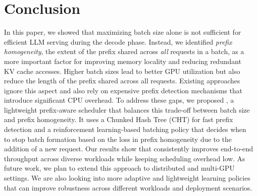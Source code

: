\vspace{-7pt}

\section{Conclusion}
\label{sec:conclusion}
In this paper, we showed that maximizing batch size alone is not sufficient for efficient LLM serving during the decode phase. Instead, we identified \textit{prefix homogeneity}, the extent of the prefix shared across \textit{all} requests in a batch, as a more important factor for improving memory locality and reducing redundant KV cache accesses. Higher batch sizes lead to better GPU utilization but also reduce the length of the prefix shared across all requests. Existing approaches ignore this aspect and also rely on expensive prefix detection mechanisms that introduce significant CPU overhead. To address these gaps, we proposed \Feather, a lightweight prefix-aware scheduler that balances this trade-off between batch size and prefix homogeneity. It uses a Chunked Hash Tree (CHT) for fast prefix detection and a reinforcement learning-based batching policy that decides when to stop batch formation based on the loss in prefix homogeneity due to the addition of a new request. Our results show that \Feather consistently improves end-to-end throughput across diverse workloads while keeping scheduling overhead low. As future work, we plan to extend this approach to distributed and multi-GPU settings. We are also looking into more adaptive and lightweight learning policies that can improve robustness across different workloads and deployment scenarios.